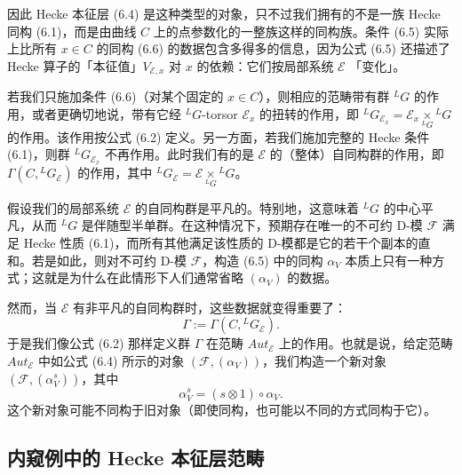 \documentclass[11pt,a4paper]{article}
\begin{document}

因此 Hecke 本征层 (6.4) 是这种类型的对象，只不过我们拥有的不是一族 Hecke 同构 (6.1)，而是由曲线 $C$ 上的点参数化的一整族这样的同构族。条件 (6.5) 实际上比所有 $x\in C$ 的同构 (6.6) 的数据包含多得多的信息，因为公式 (6.5) 还描述了 Hecke 算子的「本征值」$V_{\mathcal{E},x}$ 对 $x$ 的依赖：它们按局部系统 $\mathcal{E}$ 「变化」。

若我们只施加条件 (6.6)（对某个固定的 $x\in C$），则相应的范畴带有群 ${}^LG$ 的作用，或者更确切地说，带有它经 ${}^LG$-torsor $\mathcal{E}_x$ 的扭转的作用，即 ${}^LG_{\mathcal{E}_x} = \mathcal{E}_x\underset{{}^LG}{\times}{}^LG$ 的作用。该作用按公式 (6.2) 定义。另一方面，若我们施加完整的 Hecke 条件 (6.1)，则群 ${}^LG_{\mathcal{E}_x}$ 不再作用。此时我们有的是 $\mathcal{E}$ 的（整体）自同构群的作用，即 $\Gamma(C,{}^LG_{\mathcal{E}})$ 的作用，其中 ${}^LG_{\mathcal{E}} = \mathcal{E}\underset{{}^LG}{\times}{}^LG$。


假设我们的局部系统 $\mathcal{E}$ 的自同构群是平凡的。特别地，这意味着 ${}^LG$ 的中心平凡，从而 ${}^LG$ 是伴随型半单群。在这种情况下，预期存在唯一的不可约 D-模
$\mathcal{F}$ 满足 Hecke 性质 (6.1)，而所有其他满足该性质的 D-模都是它的若干个副本的直和。若是如此，则对不可约 D-模 $\mathcal{F}$，构造 (6.5) 中的同构 $\alpha_V$ 本质上只有一种方式；这就是为什么在此情形下人们通常省略 $(\alpha_V)$ 的数据。

然而，当 $\mathcal{E}$ 有非平凡的自同构群时，这些数据就变得重要了：
\[
\Gamma := \Gamma(C,{}^LG_{\mathcal{E}}).
\]
于是我们像公式 (6.2) 那样定义群 $\Gamma$ 在范畴 $Aut_{\mathcal{E}}$ 上的作用。也就是说，给定范畴 $Aut_{\mathcal{E}}$ 中如公式 (6.4) 所示的对象 $(\mathcal{F},(\alpha_V))$，我们构造一个新对象 $(\mathcal{F},(\alpha_V^s))$，其中
\[
\alpha_V^s = (s\otimes1)\circ\alpha_V.
\]
这个新对象可能不同构于旧对象（即使同构，也可能以不同的方式同构于它）。

\subsection{内窥例中的 Hecke 本征层范畴}
\end{document}
